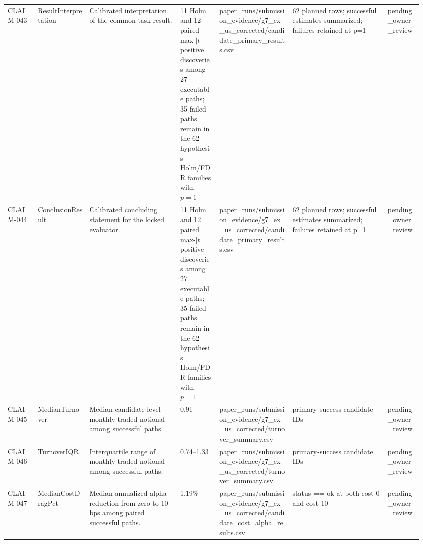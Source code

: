 \begin{longtable}{@{}L{0.07\linewidth}L{0.12\linewidth}L{0.21\linewidth}L{0.09\linewidth}L{0.17\linewidth}L{0.22\linewidth}L{0.08\linewidth}@{}}
CLAIM-\allowbreak{}043 & ResultInterp\allowbreak{}retation & Calibrated interpretation of the common-task result. & 11 Holm and 12 paired max-$|t|$ positive discoveries among 27 executable paths; 35 failed paths remain in the 62-hypothesis Holm/FDR families with $p=1$ & paper\_\allowbreak{}runs/\allowbreak{}submission\_\allowbreak{}evidence/\allowbreak{}g7\_\allowbreak{}ex\_\allowbreak{}us\_\allowbreak{}corrected/\allowbreak{}candidate\_\allowbreak{}primary\_\allowbreak{}results.\allowbreak{}csv & 62 planned rows;\allowbreak{} successful estimates summarized;\allowbreak{} failures retained at p=\allowbreak{}1 & pending\_\allowbreak{}owner\_\allowbreak{}review \\
CLAIM-\allowbreak{}044 & ConclusionRe\allowbreak{}sult & Calibrated concluding statement for the locked evaluator. & 11 Holm and 12 paired max-$|t|$ positive discoveries among 27 executable paths; 35 failed paths remain in the 62-hypothesis Holm/FDR families with $p=1$ & paper\_\allowbreak{}runs/\allowbreak{}submission\_\allowbreak{}evidence/\allowbreak{}g7\_\allowbreak{}ex\_\allowbreak{}us\_\allowbreak{}corrected/\allowbreak{}candidate\_\allowbreak{}primary\_\allowbreak{}results.\allowbreak{}csv & 62 planned rows;\allowbreak{} successful estimates summarized;\allowbreak{} failures retained at p=\allowbreak{}1 & pending\_\allowbreak{}owner\_\allowbreak{}review \\
CLAIM-\allowbreak{}045 & MedianTurnov\allowbreak{}er & Median candidate-level monthly traded notional among successful paths. & 0.91 & paper\_\allowbreak{}runs/\allowbreak{}submission\_\allowbreak{}evidence/\allowbreak{}g7\_\allowbreak{}ex\_\allowbreak{}us\_\allowbreak{}corrected/\allowbreak{}turnover\_\allowbreak{}summary.\allowbreak{}csv & primary-\allowbreak{}success candidate IDs & pending\_\allowbreak{}owner\_\allowbreak{}review \\
CLAIM-\allowbreak{}046 & TurnoverIQR & Interquartile range of monthly traded notional among successful paths. & 0.74--1.33 & paper\_\allowbreak{}runs/\allowbreak{}submission\_\allowbreak{}evidence/\allowbreak{}g7\_\allowbreak{}ex\_\allowbreak{}us\_\allowbreak{}corrected/\allowbreak{}turnover\_\allowbreak{}summary.\allowbreak{}csv & primary-\allowbreak{}success candidate IDs & pending\_\allowbreak{}owner\_\allowbreak{}review \\
CLAIM-\allowbreak{}047 & MedianCostDr\allowbreak{}agPct & Median annualized alpha reduction from zero to 10 bps among paired successful paths. & 1.19\% & paper\_\allowbreak{}runs/\allowbreak{}submission\_\allowbreak{}evidence/\allowbreak{}g7\_\allowbreak{}ex\_\allowbreak{}us\_\allowbreak{}corrected/\allowbreak{}candidate\_\allowbreak{}cost\_\allowbreak{}alpha\_\allowbreak{}results.\allowbreak{}csv & status =\allowbreak{}=\allowbreak{} ok at both cost 0 and cost 10 & pending\_\allowbreak{}owner\_\allowbreak{}review \\

\end{longtable}
